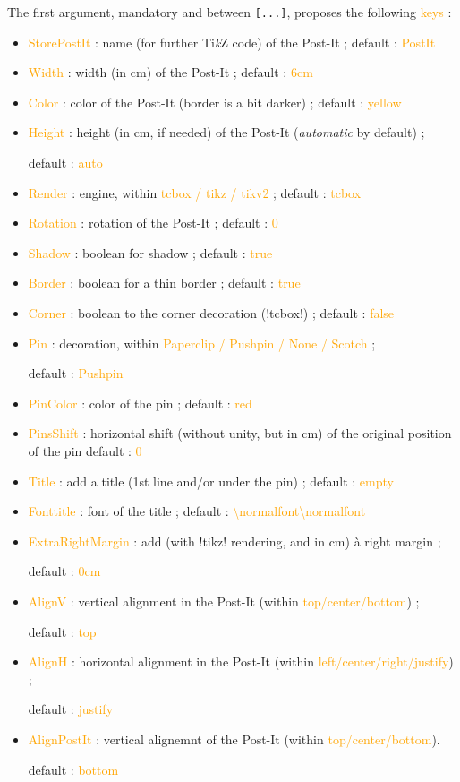 \documentclass[english,a4paper,11pt]{article}
\providecommand\tikzlogo{Ti\textit{k}Z}
\let\TikZ\tikzlogo
\newcommand\Cle[1]{{\small\sffamily\textlangle \textcolor{orange}{#1}\textrangle}}
\newcommand\cmaj[1]{\tcbox[vignetteMaJ]{#1}\xspace}
\begin{document}
\begin{tipblock}
The first argument, mandatory and between \texttt{[...]}, proposes the following \Cle{keys} :

\begin{itemize}
	\item \cmaj{0.1.3} \Cle{StorePostIt} : name (for further \TikZ{} code) of the Post-It ; \hfill{}default : \Cle{PostIt}
	\item \Cle{Width} : width (in cm) of the Post-It  ; \hfill{}default : \Cle{6cm}
	\item \Cle{Color} : color of the Post-It (border is a bit darker) ; \hfill{}default : \Cle{yellow}
	\item \Cle{Height} : height (in cm, if needed) of the Post-It (\textit{automatic} by default) ;
	
	\hfill{}default : \Cle{auto}
	\item \cmaj{0.1.1} \Cle{Render} : engine, within \Cle{tcbox / tikz / tikv2} ; \hfill{}default : \Cle{tcbox}
	\item \Cle{Rotation} : rotation of the Post-It ; \hfill{}default : \Cle{0}
	\item \Cle{Shadow} : boolean for shadow ; \hfill{}default : \Cle{true}
	\item \Cle{Border} : boolean for a thin border ; \hfill{}default : \Cle{true}
	\item \Cle{Corner} : boolean to the corner decoration (\motcletex!tcbox!) ; \hfill{}default : \Cle{false}
	\item \Cle{Pin} : decoration, within \Cle{Paperclip / Pushpin / None / Scotch} ;
	
	\hfill{}default : \Cle{Pushpin}
	\item \Cle{PinColor} : color of the pin ; \hfill{}default : \Cle{red}
	\item \Cle{PinsShift} : horizontal shift (without unity, but in cm) of the original position of the pin \hfill{}default : \Cle{0}
	\item \cmaj{0.1.1} \Cle{Title} : add a title (1st line and/or under the pin) ; \hfill{}default : \Cle{empty}
	\item \cmaj{0.1.1} \Cle{Fonttitle} : font of the title ; \hfill{}default : \Cle{\textbackslash normalfont\textbackslash normalfont}
	\item \cmaj{0.1.1} \Cle{ExtraRightMargin} : add (with \packagetex!tikz! rendering, and in cm) à right margin ;
	
	\hfill{}default : \Cle{0cm}
	\item \Cle{AlignV} : vertical alignment in the Post-It (within \Cle{top/center/bottom}) ;
	
	\hfill{}default : \Cle{top}
	\item \Cle{AlignH} : horizontal alignment in the Post-It (within \Cle{left/center/right/justify}) ;
	
	\hfill{}default : \Cle{justify}
	\item \Cle{AlignPostIt} : vertical alignemnt of the Post-It (within \Cle{top/center/bottom}).
	
	\hfill{}default : \Cle{bottom}
\end{itemize}
\vspace*{-\baselineskip}\leavevmode
\end{tipblock}
\end{document}
